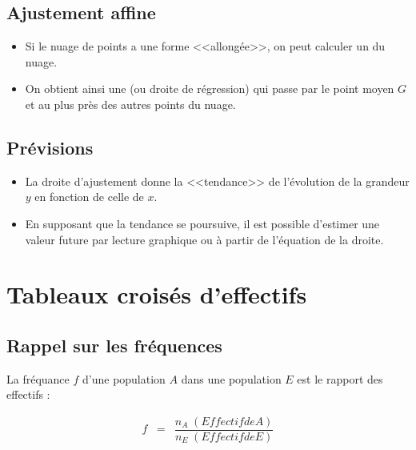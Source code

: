 \documentclass[12pt,a4paper]{article}
\begin{document}
	
	
	
\subsection{Ajustement affine}

\begin{mybilan}
	\begin{itemize}
		\item Si le nuage de points a une forme <<allongée>>, on peut calculer un  du nuage. 
		\item On obtient ainsi une  (ou droite de régression) qui passe par le point moyen $G$ et au plus près des autres points du nuage.		
	\end{itemize}
\end{mybilan}




\subsection{Prévisions}

\begin{mymeth}
	\begin{itemize}
		\item La droite d'ajustement donne la <<tendance>> de l'évolution de la grandeur $y$ en fonction de celle de $x$.
		\item En supposant que la tendance se poursuive, il est possible d'estimer une valeur future par lecture graphique ou à partir de l'équation de la droite. 
	\end{itemize}
	
	
\end{mymeth}




\newpage

\section{Tableaux croisés d'effectifs}


\subsection{Rappel sur les fréquences}

\begin{mydef}
	La fréquance $f$ d'une population $A$ dans une population $E$ est le rapport des effectifs :
	
	\begin{eqnarray*}
		f & = & \dfrac{n_A \; (Effectif de A) }{n_E \; (Effectif de E)}  \\
	\end{eqnarray*}
\end{mydef}
\end{document}
